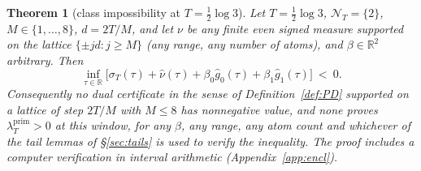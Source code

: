 \documentclass[11pt]{amsart}
\newtheorem{theorem}{Theorem}[section]
\theoremstyle{definition}
\theoremstyle{remark}
\newcommand{\R}{\mathbb R}
\newcommand{\lamP}{\lambda^{\mathrm{prim}}_T}
\newcommand{\sT}{\sigma_T}
\newcommand{\gh}[1]{\widehat g_{#1}}
\newcommand{\nuh}{\widehat\nu}
\newcommand{\NT}{\mathcal N_T}
\begin{document}
\begin{theorem}[class impossibility at $T=\frac12\log3$]\label{thm:N}
Let $T=\frac12\log3$, $\NT=\{2\}$, $M\in\{1,\dots,8\}$,
$d=2T/M$, and let $\nu$ be any finite even signed measure supported on the lattice
$\{\pm jd:j\ge M\}$ (any range, any number of atoms), and $\beta\in\R^2$ arbitrary. Then
\[
\inf_{\tau\in\R}\big[\sT(\tau)+\nuh(\tau)+\beta_0\gh0(\tau)+\beta_1\gh1(\tau)\big]\ <\ 0 .
\]
Consequently no dual certificate in the sense of Definition~\ref{def:PD} supported on a lattice of
step $2T/M$ with $M\le8$ has nonnegative value, and none proves $\lamP>0$ at this window, for any
$\beta$, any range, any atom count and whichever of the tail lemmas of \S\ref{sec:tails} is used to
verify the inequality. The proof includes a computer verification in interval arithmetic
(Appendix~\ref{app:encl}).
\end{theorem}
\end{document}
